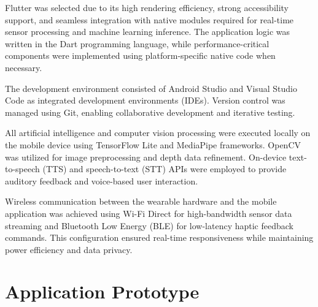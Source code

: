 Flutter was selected due to its high rendering efficiency, strong accessibility support, and seamless integration with native modules required for real-time sensor processing and machine learning inference. The application logic was written in the Dart programming language, while performance-critical components were implemented using platform-specific native code when necessary.

The development environment consisted of Android Studio and Visual Studio Code as integrated development environments (IDEs). Version control was managed using Git, enabling collaborative development and iterative testing.

All artificial intelligence and computer vision processing were executed locally on the mobile device using TensorFlow Lite and MediaPipe frameworks. OpenCV was utilized for image preprocessing and depth data refinement. On-device text-to-speech (TTS) and speech-to-text (STT) APIs were employed to provide auditory feedback and voice-based user interaction.

Wireless communication between the wearable hardware and the mobile application was achieved using Wi-Fi Direct for high-bandwidth sensor data streaming and Bluetooth Low Energy (BLE) for low-latency haptic feedback commands. This configuration ensured real-time responsiveness while maintaining power efficiency and data privacy.


\newpage
\section{Application Prototype}

